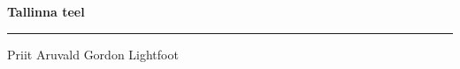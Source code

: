 \documentclass[10pt]{book}
\begin{document}
{
  \samepage
  \raggedbottom
  \raggedright
  \sloppy


  \vspace{0.2in}

  \noindent\begin{minipage}{.1\textwidth}
    \hfill\vspace{0.1in}
  \end{minipage}%
  \noindent\begin{minipage}{.8\textwidth}
    \centering
    \bfseries
    \large Tallinna teel
  \end{minipage}%
  \noindent\begin{minipage}{.1\textwidth}
      \hfill\vspace{0.1in}
  \end{minipage}

  \nopagebreak[4]
  \vspace{0.1in}
  \nopagebreak[4]
  \hrule height 0.05ex
  \nopagebreak[4]
  \vspace{-0.05in}

  {\footnotesize Priit Aruvald \hfill Gordon Lightfoot }\\
  \vspace{0.01in}



}
\end{document}
